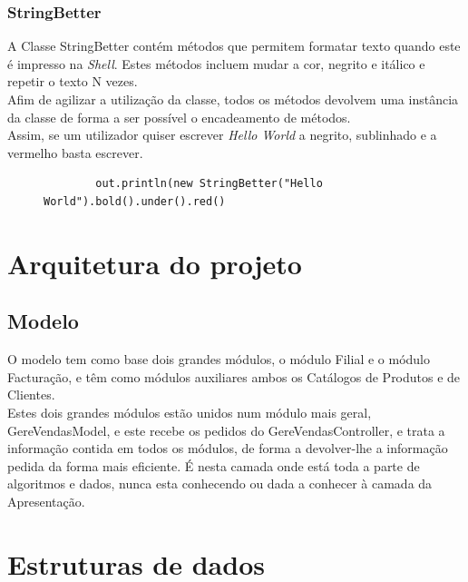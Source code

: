\documentclass[a4paper]{report}
\begin{document}
\subsection{StringBetter}

A Classe StringBetter contém métodos que permitem formatar texto quando este é impresso na
\textit{Shell}. Estes métodos incluem mudar a cor, negrito e itálico e repetir o texto N vezes.\\
Afim de agilizar a utilização da classe, todos os métodos devolvem uma instância da classe
de forma a ser possível o encadeamento de métodos.\\
Assim, se um utilizador quiser escrever \textit{Hello World} a negrito, sublinhado e a
vermelho basta escrever.
\begin{figure}[H]
    \begin{center}
        \begin{verbatim}
        out.println(new StringBetter("Hello World").bold().under().red()
        \end{verbatim}
    \end{center}
\end{figure}

\chapter{Arquitetura do projeto}


\section{Modelo}

O modelo tem como base dois grandes módulos, o módulo Filial e o módulo Facturação,
e têm como módulos auxiliares ambos os Catálogos de Produtos e de Clientes.\\
Estes dois grandes módulos estão unidos num módulo mais geral, GereVendasModel, e este recebe
os pedidos do GereVendasController, e trata a informação contida em todos os módulos, de 
forma a devolver-lhe a informação pedida da forma mais eficiente. É nesta camada
onde está toda a parte de algoritmos e dados, nunca esta conhecendo ou dada a
conhecer à camada da Apresentação.

\chapter{Estruturas de dados}
\end{document}
